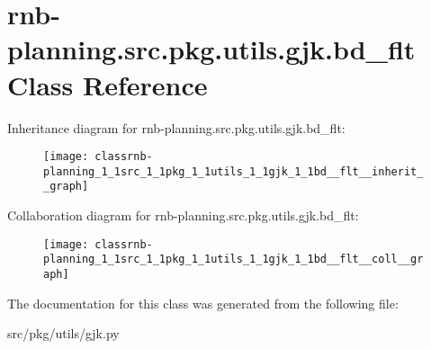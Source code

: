 \hypertarget{classrnb-planning_1_1src_1_1pkg_1_1utils_1_1gjk_1_1bd__flt}{}\section{rnb-\/planning.src.\+pkg.\+utils.\+gjk.\+bd\+\_\+flt Class Reference}
\label{classrnb-planning_1_1src_1_1pkg_1_1utils_1_1gjk_1_1bd__flt}


Inheritance diagram for rnb-\/planning.src.\+pkg.\+utils.\+gjk.\+bd\+\_\+flt\+:
\nopagebreak
\begin{figure}[H]
\begin{center}
\leavevmode
\texttt{[image: classrnb-planning\_1\_1src\_1\_1pkg\_1\_1utils\_1\_1gjk\_1\_1bd\_\_flt\_\_inherit\_\_graph]}
\end{center}
\end{figure}


Collaboration diagram for rnb-\/planning.src.\+pkg.\+utils.\+gjk.\+bd\+\_\+flt\+:
\nopagebreak
\begin{figure}[H]
\begin{center}
\leavevmode
\texttt{[image: classrnb-planning\_1\_1src\_1\_1pkg\_1\_1utils\_1\_1gjk\_1\_1bd\_\_flt\_\_coll\_\_graph]}
\end{center}
\end{figure}


The documentation for this class was generated from the following file\+:\begin{DoxyCompactItemize}
\item 
src/pkg/utils/gjk.\+py\end{DoxyCompactItemize}
